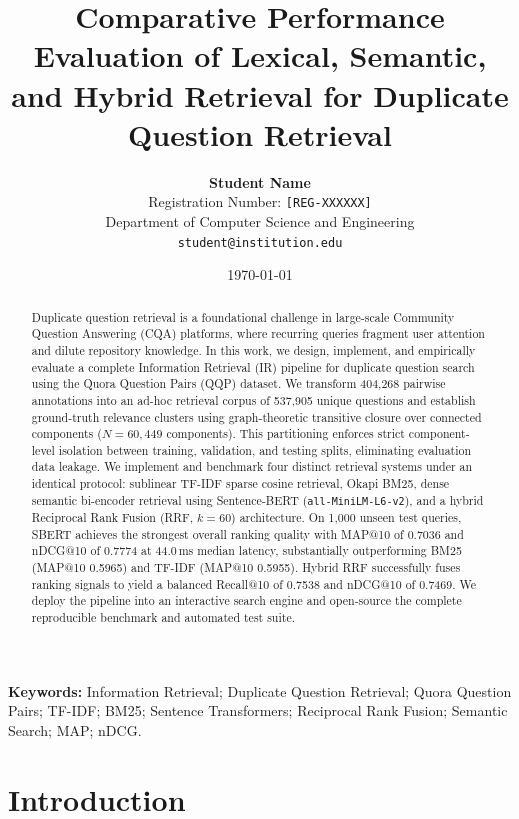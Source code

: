 \documentclass[11pt,a4paper]{article}
\title{\textbf{Comparative Performance Evaluation of Lexical, Semantic, and Hybrid Retrieval for Duplicate Question Retrieval}}
\author{
  \textbf{Student Name} \\
  Registration Number: \texttt{[REG-XXXXXX]} \\
  Department of Computer Science and Engineering \\
  \texttt{student@institution.edu}
}
\date{\today}
\begin{document}
\maketitle

\begin{abstract}
Duplicate question retrieval is a foundational challenge in large-scale Community Question Answering (CQA) platforms, where recurring queries fragment user attention and dilute repository knowledge. In this work, we design, implement, and empirically evaluate a complete Information Retrieval (IR) pipeline for duplicate question search using the Quora Question Pairs (QQP) dataset. We transform 404,268 pairwise annotations into an ad-hoc retrieval corpus of 537,905 unique questions and establish ground-truth relevance clusters using graph-theoretic transitive closure over connected components ($N=60,449$ components). This partitioning enforces strict component-level isolation between training, validation, and testing splits, eliminating evaluation data leakage. We implement and benchmark four distinct retrieval systems under an identical protocol: sublinear TF-IDF sparse cosine retrieval, Okapi BM25, dense semantic bi-encoder retrieval using Sentence-BERT (\texttt{all-MiniLM-L6-v2}), and a hybrid Reciprocal Rank Fusion (RRF, $k=60$) architecture. On 1,000 unseen test queries, SBERT achieves the strongest overall ranking quality with MAP@10 of 0.7036 and nDCG@10 of 0.7774 at 44.0\,ms median latency, substantially outperforming BM25 (MAP@10 0.5965) and TF-IDF (MAP@10 0.5955). Hybrid RRF successfully fuses ranking signals to yield a balanced Recall@10 of 0.7538 and nDCG@10 of 0.7469. We deploy the pipeline into an interactive search engine and open-source the complete reproducible benchmark and automated test suite.
\end{abstract}

\vspace{0.5em}
\noindent\textbf{Keywords:}
Information Retrieval; Duplicate Question Retrieval; Quora Question Pairs; TF-IDF; BM25; Sentence Transformers; Reciprocal Rank Fusion; Semantic Search; MAP; nDCG.

\newpage

\section{Introduction}
\label{sec:introduction}
\end{document}
